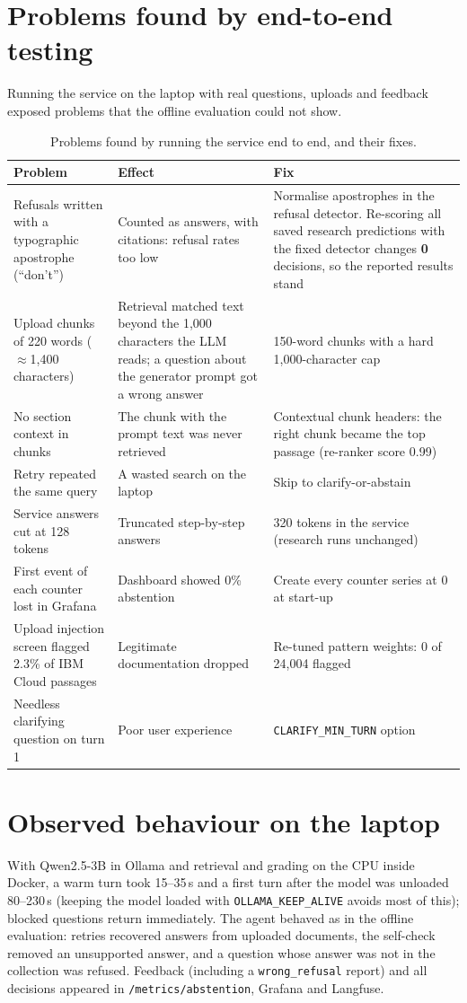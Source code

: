 \documentclass[11pt,a4paper]{report}
\begin{document}
\section{Problems found by end-to-end testing}\label{sec:servicefixes}
Running the service on the laptop with real questions, uploads and feedback exposed problems that the offline evaluation could not show.
\begin{table}[H]
\centering\small
\begin{tabularx}{\textwidth}{@{}p{3.6cm}YY@{}}
\toprule
Problem & Effect & Fix \\
\midrule
Refusals written with a typographic apostrophe (``don\textquoteright t'') & Counted as answers, with citations: refusal rates too low & Normalise apostrophes in the refusal detector. Re-scoring all saved research predictions with the fixed detector changes \textbf{0} decisions, so the reported results stand \\
Upload chunks of 220 words ($\approx$1{,}400 characters) & Retrieval matched text beyond the 1{,}000 characters the LLM reads; a question about the generator prompt got a wrong answer & 150-word chunks with a hard 1{,}000-character cap \\
No section context in chunks & The chunk with the prompt text was never retrieved & Contextual chunk headers: the right chunk became the top passage (re-ranker score 0.99) \\
Retry repeated the same query & A wasted search on the laptop & Skip to clarify-or-abstain \\
Service answers cut at 128 tokens & Truncated step-by-step answers & 320 tokens in the service (research runs unchanged) \\
First event of each counter lost in Grafana & Dashboard showed 0\% abstention & Create every counter series at 0 at start-up \\
Upload injection screen flagged 2.3\% of IBM Cloud passages & Legitimate documentation dropped & Re-tuned pattern weights: 0 of 24{,}004 flagged \\
Needless clarifying question on turn 1 & Poor user experience & \texttt{CLARIFY\_MIN\_TURN} option \\
\bottomrule
\end{tabularx}
\caption{Problems found by running the service end to end, and their fixes.}
\label{tab:servicefixes}
\end{table}

\section{Observed behaviour on the laptop}
With Qwen2.5-3B in Ollama and retrieval and grading on the CPU inside Docker, a warm turn took 15--35\,s and a first turn after the model was unloaded 80--230\,s (keeping the model loaded with \texttt{OLLAMA\_KEEP\_ALIVE} avoids most of this); blocked questions return immediately. The agent behaved as in the offline evaluation: retries recovered answers from uploaded documents, the self-check removed an unsupported answer, and a question whose answer was not in the collection was refused. Feedback (including a \texttt{wrong\_refusal} report) and all decisions appeared in \texttt{/metrics/abstention}, Grafana and Langfuse.
\end{document}

